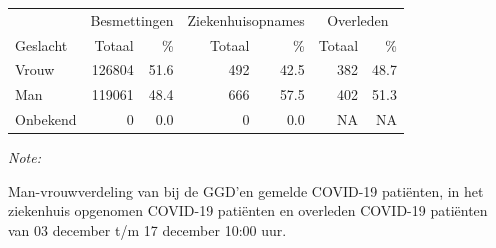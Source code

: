 \documentclass[
  english,
  man,floatsintext]{apa6}
\begin{document}
\begin{table}
\centering\begingroup\fontsize{11}{13}\selectfont

\begin{threeparttable}
\begin{tabular}{lrrrrrr}
\toprule
\multicolumn{1}{c}{ } & \multicolumn{2}{c}{Besmettingen} & \multicolumn{2}{c}{Ziekenhuisopnames} & \multicolumn{2}{c}{Overleden} \\
\cmidrule(l{3pt}r{3pt}){2-3} \cmidrule(l{3pt}r{3pt}){4-5} \cmidrule(l{3pt}r{3pt}){6-7}
Geslacht & Totaal & \% & Totaal & \% & Totaal & \%\\
\midrule
Vrouw & 126804 & 51.6 & 492 & 42.5 & 382 & 48.7\\
Man & 119061 & 48.4 & 666 & 57.5 & 402 & 51.3\\
Onbekend & 0 & 0.0 & 0 & 0.0 & NA & NA\\
\bottomrule
\end{tabular}
\begin{tablenotes}
\item \textit{Note: } 
\item Man-vrouwverdeling van bij de GGD’en gemelde COVID-19 patiënten, in het ziekenhuis opgenomen COVID-19 patiënten en overleden COVID-19 patiënten van 03 december t/m 17 december 10:00 uur.
\end{tablenotes}
\end{threeparttable}
\endgroup{}
\end{table}
\newpage
\end{document}
